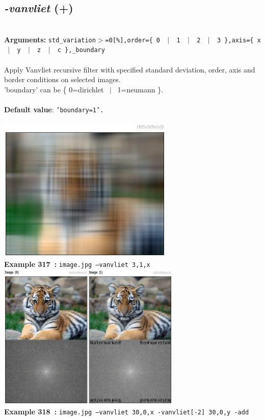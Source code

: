 \documentclass[a4paper,11pt,twoside]{book}
\begin{document}
\subsection{\emph{-vanvliet} (+)}\vspace*{-0.5em}
~\\\textbf{Arguments: } 
{\small \texttt{std\_variation$>$=0[\%],order=\{ 0 ~$|$~ 1 ~$|$~ 2 ~$|$~ 3 \},axis=\{ x ~$|$~ y ~$|$~ z ~$|$~ c \},\_boundary}}\\~\\
Apply Vanvliet recursive filter with specified standard deviation, order, axis and border
conditions on selected images.
~\\'boundary' can be \{ 0=dirichlet ~$|$~ 1=neumann \}.
~\\~\\\textbf{Default value}: {\small \texttt{'boundary=1'.}}
\begin{center}\includegraphics[keepaspectratio=true,height=7cm,width=\textwidth]{img/gmic_def317.jpg}\\
{\footnotesize \textbf{Example 317~:} \texttt{image.jpg --vanvliet 3,1,x}}
\\\includegraphics[keepaspectratio=true,height=7cm,width=\textwidth]{img/gmic_def318.jpg}\\
{\footnotesize \textbf{Example 318~:} \texttt{image.jpg --vanvliet 30,0,x -vanvliet[-2] 30,0,y -add}}
\end{center}
\end{document}
